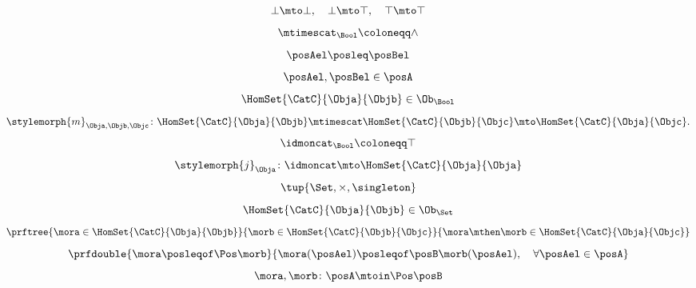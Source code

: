 {\begin{forslides}
\begin{equation*}
			\label{eq:poset_bool_c}
			\bot\mto \bot, \quad \bot\mto \top, \quad \top\mto \top
		\end{equation*}
		\begin{equation*}
			\label{eq:poset_bool_d}
			\mtimescat_\Bool \coloneqq \wedge
		\end{equation*}
		\begin{equation*}
			\label{eq:poset_bool_e}
			\posAel\posleq \posBel
		\end{equation*}
		\begin{equation*}
			\label{eq:poset_bool_f}
			\posAel,\posBel \in \posA
		\end{equation*}
		\begin{equation*}
			\label{eq:poset_bool_g}
			\HomSet{\CatC}{\Obja}{\Objb}\in \Ob_\Bool
		\end{equation*}
		\begin{equation*}
			\label{eq:poset_bool_h}
			\stylemorph{m}_{\Obja,\Objb,\Objc}\colon \HomSet{\CatC}{\Obja}{\Objb}\mtimescat \HomSet{\CatC}{\Objb}{\Objc}\mto \HomSet{\CatC}{\Obja}{\Objc}.
		\end{equation*}
		\begin{equation*}
			\label{eq:poset_bool_i}
			\idmoncat_\Bool \coloneqq \top
		\end{equation*}
		\begin{equation*}
			\label{eq:poset_bool_k}
			\stylemorph{j}_\Obja\colon \idmoncat \mto \HomSet{\CatC}{\Obja}{\Obja}
		\end{equation*}
		\begin{equation*}
			\label{eq:poset_bool_j}
			\tup{\Set, \times, \singleton}
		\end{equation*}
		\begin{equation*}
			\label{eq:poset_bool_l}
			\HomSet{\CatC}{\Obja}{\Objb}\in \Ob_\Set
		\end{equation*}
		\begin{equation*}
			\label{eq:poset_bool_m}
			\prftree{\mora \in \HomSet{\CatC}{\Obja}{\Objb}}{\morb \in \HomSet{\CatC}{\Objb}{\Objc}}{{\mora\mthen \morb \in \HomSet{\CatC}{\Obja}{\Objc}}}
		\end{equation*}
		\begin{equation*}
			\label{eq:poset_pos_a}
			\prfdouble{\mora \posleqof\Pos \morb}{\mora(\posAel)\posleqof\posB \morb(\posAel), \quad \forall \posAel \in \posA}
		\end{equation*}
		\begin{equation*}
			\label{eq:poset_pos_b}
			\mora,\morb\colon \posA\mtoin\Pos \posB

\end{equation*}
\end{forslides}}
